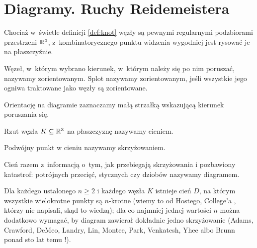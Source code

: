 
\section{Diagramy. Ruchy Reidemeistera}

Chociaż w~świetle definicji \ref{def:knot} węzły są pewnymi regularnymi podzbiorami przestrzeni $\mathbb R^3$, z~kombinatorycznego punktu widzenia wygodniej jest rysować je na płaszczyźnie.

\begin{definition}[orientacja]
%
%
    Węzeł, w~którym wybrano kierunek, w~którym należy się po nim poruszać, nazywamy zorientowanym.
    Splot nazywamy zorientowanym, jeśli wszystkie jego ogniwa traktowane jako węzły są zorientowane.
\end{definition}

Orientację na diagramie zaznaczamy małą strzałką wskazującą kierunek poruszania się.

\begin{definition}
%
    Rzut węzła $K \subseteq \mathbb R^3$ na płaszczyznę nazywamy cieniem.
\end{definition}

\begin{definition}[skrzyżowanie]
%
    Podwójny punkt w cieniu nazywamy skrzyżowaniem.
\end{definition}

\begin{definition}[diagram]
%
    Cień razem z~informacją o~tym, jak przebiegają skrzyżowania i pozbawiony katastrof: potrójnych przecięć, stycznych czy dziobów nazywamy diagramem.
\end{definition}

Dla każdego ustalonego $n \ge 2$ i każdego węzła $K$ istnieje cień $D$, na którym wszystkie wielokrotne punkty są $n$-krotne (wiemy to od Hostego, College'a \cite[s. 11]{adams21}, którzy nie napisali, skąd to wiedzą); dla co najmniej jednej wartości $n$ można dodatkowo wymagać, by diagram zawierał dokładnie jedno skrzyżowanie (Adams, Crawford, DeMeo, Landry, Lin, Montee, Park, Venkatesh, Yhee \cite{venkatesh15} albo Brunn ponad sto lat temu \cite[s. 28]{adams21}!).
%
%
%
%
%
%
%
%
%
%

